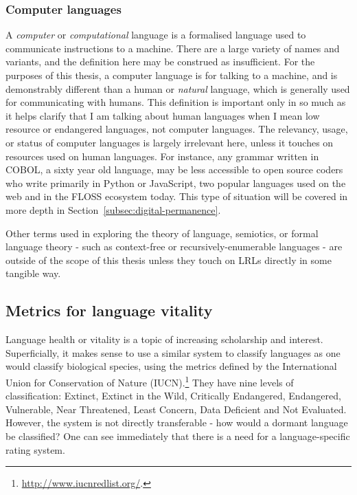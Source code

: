 \subsubsection{Computer languages}

A \textit{computer} or \textit{computational} language is a formalised language used to communicate instructions to a machine. There are a large variety of names and variants, and the definition here may be construed as insufficient. For the purposes of this thesis, a computer language is for talking to a machine, and is demonstrably different than a human or \textit{natural} language, which is generally used for communicating with humans. This definition is important only in so much as it helps clarify that I am talking about human languages when I mean low resource or endangered languages, not computer languages. The relevancy, usage, or status of computer languages is largely irrelevant here, unless it touches on resources used on human languages. For instance, any grammar written in COBOL, a sixty year old language, may be less accessible to open source coders who write primarily in Python or JavaScript, two popular languages used on the web and in the FLOSS ecosystem today. This type of situation will be covered in more depth in Section~\ref{subsec:digital-permanence}.

Other terms used in exploring the theory of language, semiotics, or formal language theory - such as context-free or recursively-enumerable languages - are outside of the scope of this thesis unless they touch on LRLs directly in some tangible way.

\subsection{Metrics for language vitality}
\label{subsec:metrics}

Language health or vitality is a topic of increasing scholarship and interest. Superficially, it makes sense to use a similar system to classify languages as one would classify biological species, using the metrics defined by the International Union for Conservation of Nature (IUCN).\footnote{\href{http://www.iucnredlist.org/}{http://www.iucnredlist.org/}. } They have nine levels of classification: Extinct, Extinct in the Wild, Critically Endangered, Endangered, Vulnerable, Near Threatened, Least Concern, Data Deficient and Not Evaluated. However, the system is not directly transferable - how would a dormant language be classified? One can see immediately that there is a need for a language-specific rating system.

